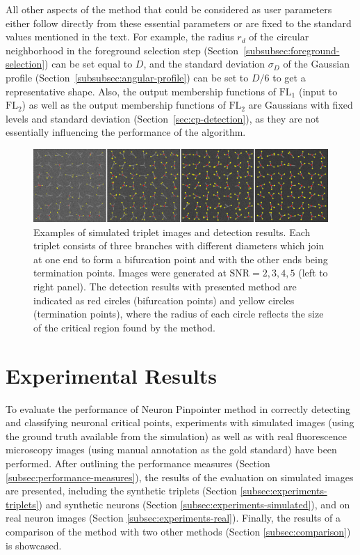 All other aspects of the method that could be considered as user parameters either follow directly from these essential parameters or are fixed to the standard values mentioned in the text. For example, the radius $r_d$ of the circular neighborhood in the foreground selection step (Section~\ref{subsubsec:foreground-selection}) can be set equal to $D$, and the standard deviation $\sigma_{\!D}$ of the Gaussian profile (Section~\ref{subsubsec:angular-profile}) can be set to $D/6$ to get a representative shape. Also, the output membership functions of $\textrm{FL}_1$ (input to $\textrm{FL}_2$) as well as the output membership functions of $\textrm{FL}_2$ are Gaussians with fixed levels and standard deviation (Section~\ref{sec:cp-detection}), as they are not essentially influencing the performance of the algorithm.
\begin{figure}%
	\centering
	\includegraphics[width=\columnwidth]{fig12}
	\caption{Examples of simulated triplet images and detection results. Each triplet consists of three branches with different diameters which join at one end to form a bifurcation point and with the other ends being termination points. Images were generated at $\textrm{SNR}=2,3,4,5$ (left to right panel). The detection results with presented method are indicated as red circles (bifurcation points) and yellow circles (termination points), where the radius of each circle reflects the size of the critical region found by the method.}
	\label{fig12}
\end{figure}
\section{Experimental Results}
\label{sec:experiments}
To evaluate the performance of Neuron Pinpointer method in correctly detecting and classifying neuronal critical points, experiments with simulated images (using the ground truth available from the simulation) as well as with real fluorescence microscopy images (using manual annotation as the gold standard) have been performed. After outlining the performance measures (Section \ref{subsec:performance-measures}), the results of the evaluation on simulated images are presented, including the synthetic triplets (Section \ref{subsec:experiments-triplets}) and synthetic neurons (Section \ref{subsec:experiments-simulated}), and on real neuron images (Section \ref{subsec:experiments-real}). Finally, the results of a comparison of the method with two other methods (Section \ref{subsec:comparison}) is showcased.
